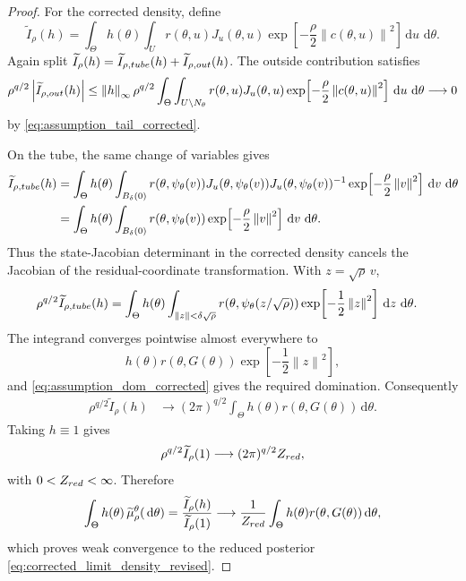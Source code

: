 \documentclass[10pt,a4paper]{amsart}
\newcommand{\abs}[1]{\left\lvert #1\right\rvert}
\newcommand{\dd}{\,\mathrm{d}}
\newcommand{\norm}[1]{\left\lVert #1\right\rVert}
\begin{document}
\begin{proof}
For the corrected density, define
\begin{equation}
 \widetilde I_\rho(h)
 =
 \int_\Theta h(\theta)
 \int_U
 r(\theta,u)J_u(\theta,u)
 \exp\!\left[-\frac{\rho}{2}\norm{c(\theta,u)}^2\right]
 \dd u\,\dd\theta .
 \label{eq:I_tilde_rho_h}
\end{equation}
Again split
\(\widetilde I_\rho(h)=\widetilde I_{\rho,{\rm tube}}(h)+
\widetilde I_{\rho,{\rm out}}(h)\). The outside contribution satisfies
\[
 \rho^{q/2}\abs{\widetilde I_{\rho,{\rm out}}(h)}
 \le
 \norm{h}_\infty
 \rho^{q/2}
 \int_\Theta\int_{U\setminus N_\theta}
 r(\theta,u)J_u(\theta,u)
 \exp\!\left[-\frac{\rho}{2}\norm{c(\theta,u)}^2\right]
 \dd u\,\dd\theta
 \longrightarrow 0
\]
by \eqref{eq:assumption_tail_corrected}.

On the tube, the same change of variables gives
\begin{align}
 \widetilde I_{\rho,{\rm tube}}(h)
 &=
 \int_\Theta h(\theta)
 \int_{B_\delta(0)}
 r(\theta,\psi_\theta(v))
 J_u(\theta,\psi_\theta(v))
 J_u(\theta,\psi_\theta(v))^{-1}
 \exp\!\left[-\frac{\rho}{2}\norm{v}^2\right]
 \dd v\,\dd\theta \notag\\
 &=
 \int_\Theta h(\theta)
 \int_{B_\delta(0)}
 r(\theta,\psi_\theta(v))
 \exp\!\left[-\frac{\rho}{2}\norm{v}^2\right]
 \dd v\,\dd\theta .
 \label{eq:I_tilde_cancel}
\end{align}
Thus the state-Jacobian determinant in the corrected density cancels the Jacobian of the residual-coordinate transformation. With \(z=\sqrt{\rho}\,v\),
\begin{align}
 \rho^{q/2}\widetilde I_{\rho,{\rm tube}}(h)
 &=
 \int_\Theta h(\theta)
 \int_{\norm{z}<\delta\sqrt{\rho}}
 r(\theta,\psi_\theta(z/\sqrt{\rho}))
 \exp\!\left[-\frac{1}{2}\norm{z}^2\right]
 \dd z\,\dd\theta .
 \label{eq:I_tilde_scaled_z}
\end{align}
The integrand converges pointwise almost everywhere to
\[
 h(\theta)r(\theta,G(\theta))
 \exp\!\left[-\frac{1}{2}\norm{z}^2\right],
\]
and \eqref{eq:assumption_dom_corrected} gives the required domination.
Consequently
\begin{align}
 \rho^{q/2}\widetilde I_\rho(h)
 &\longrightarrow
 (2\pi)^{q/2}
 \int_\Theta h(\theta)r(\theta,G(\theta))\dd\theta .
 \label{eq:I_tilde_limit_revised}
\end{align}
Taking \(h\equiv1\) gives
\[
 \rho^{q/2}\widetilde I_\rho(1)
 \longrightarrow
 (2\pi)^{q/2}Z_{\rm red},
\]
with \(0<Z_{\rm red}<\infty\). Therefore
\[
 \int_\Theta h(\theta)\,\widetilde\mu_\rho^\theta(\dd\theta)
 =
 \frac{\widetilde I_\rho(h)}{\widetilde I_\rho(1)}
 \longrightarrow
 \frac{1}{Z_{\rm red}}
 \int_\Theta h(\theta)r(\theta,G(\theta))\dd\theta ,
\]
which proves weak convergence to the reduced posterior
\eqref{eq:corrected_limit_density_revised}.
\end{proof}
\end{document}
